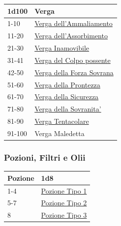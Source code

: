 \begin{multicols}{2}
{{\small\begin{tabularx}{\linewidth}{ll}
		\toprule
\rowcolor{gray!20}\textbf{1d100} & \textbf{Verga}\\
\toprule
1-10 & \hyperlink{Verga dell'Ammaliamento}{Verga dell'Ammaliamento}\\
\rowcolor{gray!20}11-20 & \hyperlink{Verga dell'Assorbimento}{Verga dell'Assorbimento}\\
21-30 & \hyperlink{Verga Inamovibile}{Verga Inamovibile}\\
\rowcolor{gray!20}31-41 & \hyperlink{Verga del Colpo possente}{Verga del Colpo possente}\\
42-50 & \hyperlink{Verga della Forza Sovrana}{Verga della Forza Sovrana}\\
\rowcolor{gray!20}51-60 & \hyperlink{Verga della Prontezza}{Verga della Prontezza}\\
61-70 & \hyperlink{Verga della Sicurezza}{Verga della Sicurezza}\\
\rowcolor{gray!20}71-80 & \hyperlink{Verga della Sovranita'}{Verga della Sovranita'}\\
81-90 & \hyperlink{Verga Tentacolare}{Verga Tentacolare}\\
\rowcolor{gray!20}91-100 & Verga Maledetta\\
\end{tabularx}}

\subsubsection{Pozioni, Filtri e Olii}\hypertarget{pozionifiltri}{}\label{pozionifiltri}

{\small\begin{tabularx}{\linewidth}{ll}
		\toprule
\rowcolor{gray!20}\textbf{Pozione}&\textbf{1d8}\\
\toprule
 1-4&\hyperlink{pozionifiltri}{Pozione Tipo 1}\\
 \rowcolor{gray!20}5-7&\hyperlink{pozionifiltri}{Pozione Tipo 2}\\
 8  &\hyperlink{pozionifiltri}{Pozione Tipo 3}
\end{tabularx}}

\medskip\hypertarget{Pozione Tipo 1}{}

}
\end{multicols}
